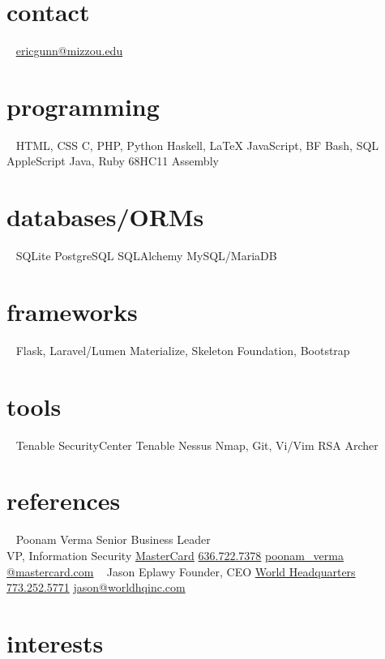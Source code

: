 \documentclass[print]{gunn-resume}
\begin{document}
\begin{aside}
  \section{contact}
  ~
    \href{mailto:ericgunn@mizzou.edu}{ericgunn@mizzou.edu}
  \section{programming}
  ~
    HTML, CSS
    C, PHP, Python
    Haskell, \LaTeX
    JavaScript, BF
    Bash, SQL
    AppleScript
    Java, Ruby
    68HC11 Assembly
 \section{databases/ORMs}
 ~
 SQLite
 PostgreSQL
 SQLAlchemy
 MySQL/MariaDB
 \section{frameworks}
 ~
 Flask, Laravel/Lumen
 Materialize, Skeleton
 Foundation, Bootstrap
 \section{tools}
 ~
 Tenable SecurityCenter
 Tenable Nessus
 Nmap, Git, Vi/Vim
 RSA Archer
 \section{references}
 ~
 Poonam Verma
 Senior Business Leader\\VP, Information Security
 \href{http://mastercard.com}{MasterCard}
 \href{16367227378}{636.722.7378}
\href{mailto:poonam_verma@mastercard.com}{poonam\_verma\\@mastercard.com}
 ~
 Jason Eplawy
 Founder, CEO
 \href{http://worldhqinc.com}{World Headquarters}
 \href{17732525771}{773.252.5771}
\href{mailto:jason@worldhqinc.com}{jason@worldhqinc.com}
 ~
\end{aside}

\section{interests}
\end{document}
